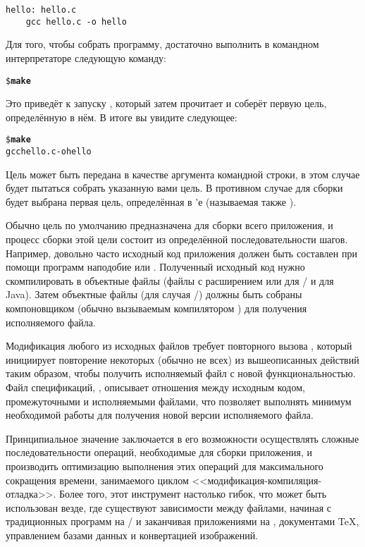 {\footnotesize
\begin{verbatim}
hello: hello.c
    gcc hello.c -o hello
\end{verbatim}
}

Для того, чтобы собрать программу, достаточно выполнить в командном
интерпретаторе следующую команду:

{\footnotesize
\begin{alltt}
\$ \textbf{make}
\end{alltt}
}

Это приведёт к запуску \GNUmake{}, который затем прочитает \Makefile{}
и соберёт первую цель, определённую в нём. В итоге вы увидите
следующее:

{\footnotesize
\begin{alltt}
\$ \textbf{make}
gcc hello.c -o hello
\end{alltt}
}

Цель может быть передана в качестве аргумента командной строки,
в этом случае \GNUmake{} будет пытаться собрать указанную вами цель.
В противном случае для сборки будет выбрана первая цель, определённая
в \Makefile{}'е (называемая также ).

Обычно цель по умолчанию предназначена для сборки всего приложения, и
процесс сборки этой цели состоит из определённой последовательности
шагов.  Например, довольно часто исходный код приложения должен быть
составлен при помощи программ наподобие  или
. Полученный исходный код нужно скомпилировать в
объектные файлы (файлы с расширением  или 
для \Clang{}/\Cplusplus{} и  для Java).  Затем
объектные файлы (для случая \Clang{}/\Cplusplus{}) должны быть собраны
компоновщиком (обычно вызываемым компилятором ) для
получения исполняемого файла.

Модификация любого из исходных файлов требует повторного вызова
\GNUmake{}, который инициирует повторение некоторых (обычно не всех)
из вышеописанных действий таким образом, чтобы получить исполняемый
файл с новой функциональностью. Файл спецификаций, \Makefile{},
описывает отношения между исходным кодом, промежуточными и
исполняемыми файлами, что позволяет \GNUmake{} выполнять минимум
необходимой работы для получения новой версии исполняемого файла.

Принципиальное значение \GNUmake{} заключается в его возможности
осуществлять сложные последовательности операций, необходимые для
сборки приложения, и производить оптимизацию выполнения этих операций
для максимального сокращения времени, занимаемого циклом
<<модификация\hyp{}компиляция\hyp{}отладка>>. Более того, этот
инструмент настолько гибок, что может быть использован везде, где
существуют зависимости между файлами, начиная с традиционных программ
на \Clang/\Cplusplus{} и заканчивая приложениями на \Java{},
документами \TeX{}, управлением базами данных и конвертацией
изображений.







